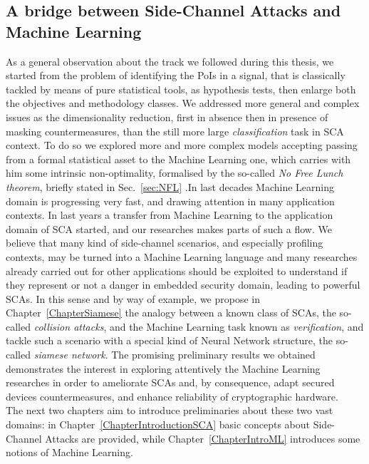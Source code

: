 \subsection{A bridge between Side-Channel Attacks and Machine Learning}
As a general observation about the track we followed during this thesis, we started from the problem of identifying the PoIs in a signal, that is classically tackled by means of pure statistical tools, as hypothesis tests,  then enlarge both the objectives and methodology classes. We addressed more general and complex issues as the dimensionality reduction, first in absence then in presence of masking countermeasures, than the still more large \emph{classification} task in SCA context. To do so we explored more and more complex models accepting passing from a formal statistical asset to the Machine Learning one, which carries with him some intrinsic non-optimality, formalised by the so-called \emph{No Free Lunch theorem}, briefly stated in Sec.~\ref{sec:NFL} .In last decades Machine Learning domain is progressing very fast, and drawing attention in many application contexts. In last years a transfer from Machine Learning to the application domain of SCA started, and our researches makes parts of such a flow. We believe that many kind of side-channel scenarios, and especially profiling contexts, may be turned into a Machine Learning language and many researches already carried out for other applications should be exploited to understand if they represent or not a danger in embedded security domain, leading to powerful SCAs. In this sense and by way of example, we propose in Chapter~\ref{ChapterSiamese} the analogy between a known class of SCAs, the so-called \emph{collision attacks}, and the Machine Learning task known as \emph{verification}, and tackle such a scenario with a special kind of Neural Network structure, the so-called \emph{siamese network}. The promising preliminary results we obtained demonstrates the interest in exploring attentively the Machine Learning researches in order to ameliorate SCAs and, by consequence, adapt secured devices countermeasures, and enhance reliability of cryptographic hardware. \\

The next two chapters aim to introduce preliminaries about these two vast domains: in Chapter~\ref{ChapterIntroductionSCA} basic concepts about Side-Channel Attacks are provided, while Chapter~\ref{ChapterIntroML} introduces some notions of Machine Learning.
